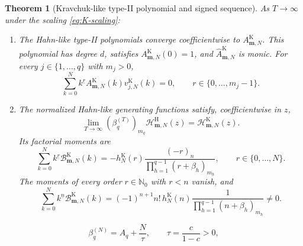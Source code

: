 \documentclass[10pt,a4paper]{amsart}
\newtheorem{theorem}{Theorem}
\newcommand{\Nzero}{\mathbb N_0}
\newcommand{\fall}[2]{#1^{\underline{#2}}}
\newcommand{\mm}{\boldsymbol m}
\begin{document}
\begin{theorem}[Kravchuk-like type-II polynomial and signed sequence]
\label{thm:K-forms}
As \(T\to\infty\) under the scaling \eqref{eq:K-scaling}:
\begin{enumerate}[label=\textup{(\roman*)}]
\item The Hahn-like type-II polynomials converge coefficientwise to
\(A_{\mm,N}^{\mathrm K}\). This polynomial has degree \(d\), satisfies
\(A_{\mm,N}^{\mathrm K}(0)=1\), and \(\widehat
A_{\mm,N}^{\mathrm K}\) is monic. For every
\(j\in\{1,\ldots,q\}\) with \(m_j>0\),
\begin{equation}
 \sum_{k=0}^N\fall{k}{r}
 A_{\mm,N}^{\mathrm K}(k)v_{j,N}^{\mathrm K}(k)=0,
 \qquad r\in\{0,\ldots,m_j-1\}.
 \label{eq:K-A-orthogonality}
\end{equation}
\item The normalized Hahn-like generating functions satisfy, coefficientwise
in \(z\),
\begin{equation}
 \lim_{T\to\infty}
 (\beta_q^{(T)})_{m_q}
 \mathcal H_{\mm,N}^{\mathrm H}(z)
 =\mathcal H_{\mm,N}^{\mathrm K}(z).
 \label{eq:K-B-limit}
\end{equation}
Its factorial moments are
\begin{equation}
 \sum_{k=0}^N\fall{k}{r}
 \mathcal B_{\mm,N}^{\mathrm K}(k)
 =
 -h_N^{\mathrm K}(r)
 \frac{(-r)_n}
 {\prod_{h=1}^{q-1}(r+\beta_h)_{m_h}},
 \qquad r\in\{0,\ldots,N\}.
 \label{eq:K-B-moments}
\end{equation}
The moments of every order \(r\in\Nzero\) with \(r<n\) vanish, and
\begin{equation}
 \sum_{k=0}^N\fall{k}{n}
 \mathcal B_{\mm,N}^{\mathrm K}(k)
 =
 (-1)^{n+1}n!\,h_N^{\mathrm K}(n)
 \frac{1}{\prod_{h=1}^{q-1}(n+\beta_h)_{m_h}}
 \ne0.
 \label{eq:K-B-leading-moment}
\end{equation}
\end{enumerate}
\end{theorem}

\begin{equation}
 \beta_q^{(N)}=A_q+\frac{N}{\tau},
 \qquad
 \tau=\frac{c}{1-c}>0,
 \label{eq:MII-scaling}
\end{equation}
\end{document}
